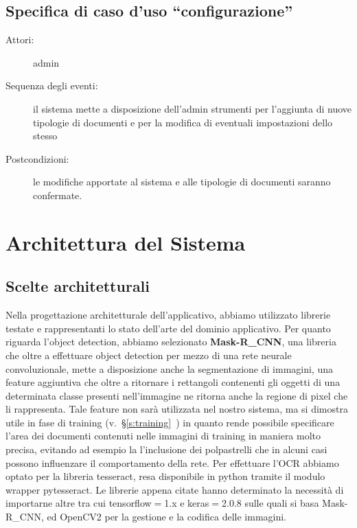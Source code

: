 \documentclass[12pt,a4paper]{article}
\newcommand{\mrcnn}{Mask-R\_CNN}
\begin{document}
\subsection{Specifica di caso d'uso ``configurazione''}
\begin{description}
    \item[Attori:] admin
    \item[Sequenza degli eventi:] il sistema mette a disposizione
        dell'admin strumenti per l'aggiunta di nuove tipologie di
        documenti e per la modifica di eventuali impostazioni dello
        stesso
    \item[Postcondizioni:] le modifiche apportate al sistema e alle
        tipologie di documenti saranno confermate.
\end{description}

\section{Architettura del Sistema}

\subsection{Scelte architetturali}

Nella progettazione architetturale dell'applicativo, abbiamo utilizzato
librerie testate e rappresentanti lo stato dell'arte del dominio
applicativo. Per quanto riguarda l'object detection, abbiamo selezionato
\textbf{\mrcnn}, una libreria che oltre a effettuare object detection
per mezzo di una rete neurale convoluzionale, mette a disposizione anche
la segmentazione di immagini, una feature aggiuntiva che oltre a
ritornare i rettangoli contenenti gli oggetti di una determinata classe
presenti nell'immagine ne ritorna anche la regione di pixel che li
rappresenta. Tale feature non sarà utilizzata nel nostro sistema, ma si
dimostra utile in fase di training
(v.~§\ref{s:training}~) in quanto rende possibile
specificare l'area dei documenti contenuti nelle immagini di training in
maniera molto precisa, evitando ad esempio la l'inclusione dei
polpastrelli che in alcuni casi possono influenzare il comportamento
della rete. Per effettuare l'OCR abbiamo optato per la libreria
tesseract, resa disponibile in python tramite il modulo wrapper
pytesseract. Le librerie appena citate hanno determinato la necessità di
importarne altre tra cui tensorflow$=$1.x e keras$=$2.0.8 sulle quali si
basa \mrcnn, ed OpenCV2 per la gestione e la codifica delle immagini.
\end{document}
